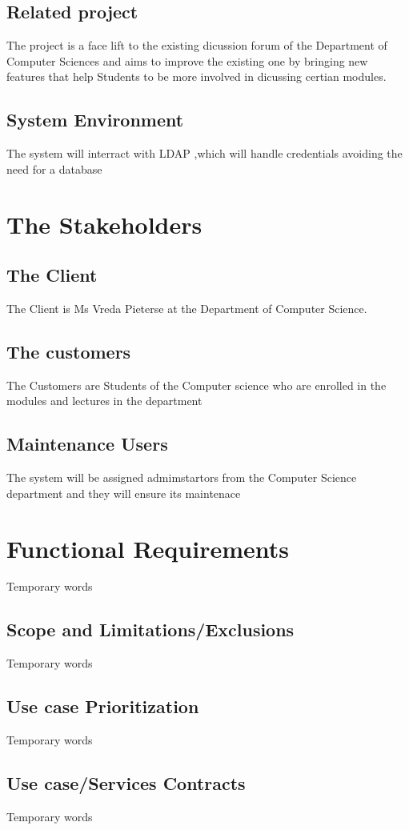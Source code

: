 \documentclass[11pt]{article}
\begin{document}
\subsection{Related project}
The project is a face lift to the existing dicussion forum of the Department of Computer Sciences and aims to improve the existing one by bringing new features that help Students to be more involved in dicussing certian modules.
\subsection{System Environment}
The system will interract with LDAP ,which will handle credentials avoiding the need for a database

\section{The Stakeholders}

\subsection{The Client}
The Client is Ms Vreda Pieterse at the Department of Computer Science.
\subsection{The customers}
The Customers are Students of the Computer science who are enrolled in the modules and lectures in the department
\subsection{Maintenance Users}
The system will be assigned admimstartors from the Computer Science department and they will ensure its maintenace




\newpage
\section{Functional Requirements}
Temporary words
\subsection{Scope and Limitations/Exclusions}
Temporary words
\subsection{Use case Prioritization}
Temporary words
\subsection{Use case/Services Contracts}
Temporary words
\end{document}
